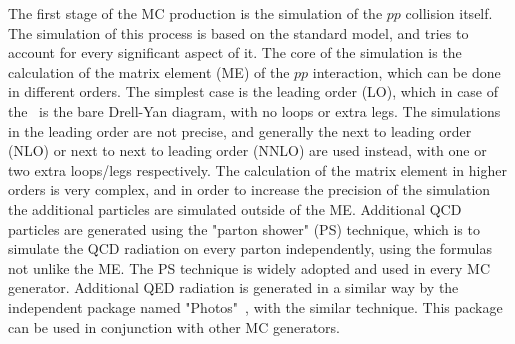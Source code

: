 The first stage of the MC production is the simulation of the $pp$ collision itself. The simulation of this process is based on the standard model, and tries to account for every significant aspect of it. The core of the simulation is the calculation of the matrix element (ME) of the $pp$ interaction, which can be done in different orders. The simplest case is the leading order (LO), which in case of the \Zee\ is the bare Drell-Yan diagram, with no loops or extra legs. The simulations in the leading order are not precise, and generally the next to leading order (NLO) or next to next to leading order (NNLO) are used instead, with one or two extra loops/legs respectively. The calculation of the matrix element in higher orders is very complex, and in order to increase the precision of the simulation the additional particles are simulated outside of the ME. Additional QCD particles are generated using the "parton shower" (PS) technique, which is to simulate the QCD radiation on every parton independently, using the formulas not unlike the ME. The PS technique is widely adopted and used in every MC generator. Additional QED radiation is generated in a similar way by the independent package named "Photos"~\cite{lib:photos}, with the similar technique. This package can be used in conjunction with other MC generators.

